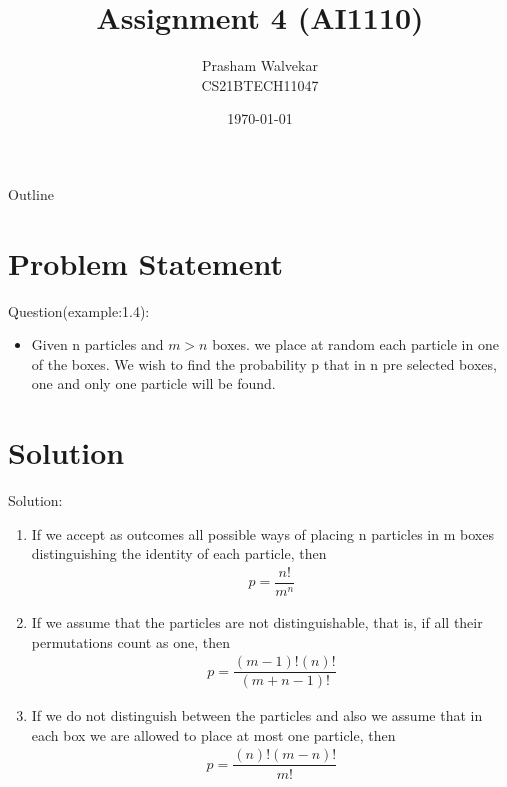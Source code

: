 \documentclass{beamer}
\title{Assignment 4 (AI1110)}
\author{Prasham Walvekar\\
        CS21BTECH11047}
\date{\today}
\begin{document}
\begin{frame}
    \titlepage 
\end{frame}

\logo{}


\begin{frame}{Outline}
    \tableofcontents
\end{frame}


\section{Problem Statement}
\begin{frame}{Question(example:1.4):}

\begin{itemize}
    \item Given n particles and $m > n$ boxes. we place at random each particle in one of the 
boxes. We wish to find the probability p that in n pre selected boxes, one and only one particle will be found. 
\end{itemize}
\end{frame}
\section{Solution}
\begin{frame}{Solution:}
   \begin{enumerate}
       \item If we accept as outcomes all possible ways of placing n particles in m boxes distinguishing the identity of each particle, then
       \begin{align}
           p =\dfrac{n!}{m^n}        
           \end{align}
        \item If we assume that the particles are not distinguishable, that is, if all their permutations count as one, then
        \begin{align}
            p =\dfrac{(m-1)!(n)!}{(m+n-1)!} 
        \end{align}
         \item If we do not distinguish between the particles and also we assume that in each box we are allowed to place at most one particle, then 
         \begin{align}
             p =\dfrac{(n)!(m-n)!}{m!}
         \end{align}
     \end{enumerate}
    
\end{frame}
\end{document}
